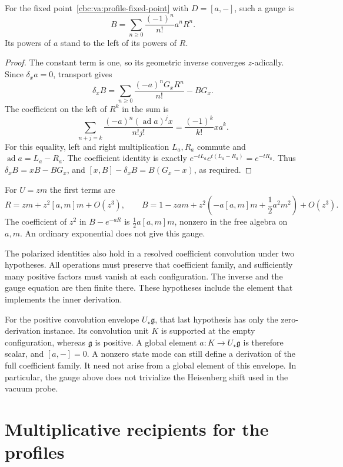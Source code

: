 \begin{proposition}\label{cbc:va:inner-gauge}
For the fixed point~\eqref{cbc:va:profile-fixed-point}
with $D=[a,-]$, such a gauge is
\begin{equation}\label{cbc:va:ordered-gauge}
 B=\sum_{n\geq0}\frac{(-1)^n}{n!}a^nR^n.
\end{equation}
Its powers of $a$ stand to the left of its powers
of $R$.
\end{proposition}
\begin{proof}
The constant term is one, so its geometric inverse
converges $z$-adically.
Since $\delta_xa=0$, transport gives
\[
 \delta_xB
   =\sum_{n\geq0}\frac{(-a)^nG_xR^n}{n!}-BG_x.
\]
The coefficient on the left of $R^k$ in the sum is
\[
 \sum_{n+j=k}\frac{(-a)^n(\operatorname{ad}a)^jx}{n!j!}
       =\frac{(-1)^k}{k!}xa^k.
\]
For this equality, left and right multiplication
$L_a,R_a$ commute and $\operatorname{ad}a=L_a-R_a$.
The coefficient identity is exactly
$e^{-tL_a}e^{t(L_a-R_a)}=e^{-tR_a}$.
Thus $\delta_xB=xB-BG_x$, and
$[x,B]-\delta_xB=B(G_x-x)$, as required.
\end{proof}

For $U=zm$ the first terms are
\[
 R=zm+z^2[a,m]m+O(z^3),\qquad
 B=1-zam+z^2\left(-a[a,m]m+\frac12a^2m^2\right)
       +O(z^3).
\]
The coefficient of $z^2$ in $B-e^{-aR}$ is
$\frac12a[a,m]m$, nonzero in the free algebra on
$a,m$. An ordinary exponential does not give this
gauge.

The polarized identities also hold in a resolved
coefficient convolution under two hypotheses.
All operations must preserve that coefficient family,
and sufficiently many positive factors must vanish
at each configuration.
The inverse and the gauge equation are then finite
there. These hypotheses include the element that
implements the inner derivation.

For the positive convolution envelope
$U_\star\mathfrak g$, that last hypothesis has only
the zero-derivation instance. Its convolution unit
$K$ is supported at the empty configuration, whereas
$\mathfrak g$ is positive. A global element
$a:K\to U_\star\mathfrak g$ is therefore scalar,
and $[a,-]=0$. A nonzero state mode can still define
a derivation of the full coefficient family. It
need not arise from a global element of this
envelope. In particular, the gauge above does not
trivialize the Heisenberg shift used in the vacuum
probe.

\section{Multiplicative recipients for the profiles}
\label{cbc:va:profile-recipients}

